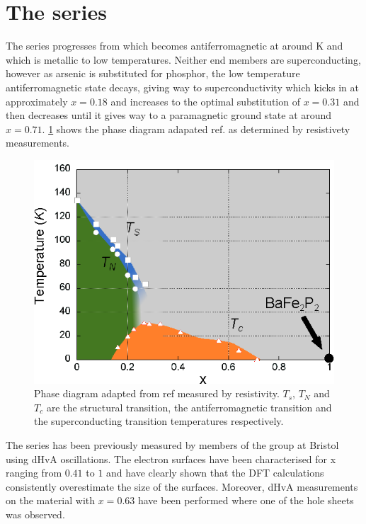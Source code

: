 
\section{The \BaFePAs series}

The \BaFeAsP series progresses from \BaFeAs which becomes antiferromagnetic at around \unit[138]{K} and \BaFeP which is metallic to low temperatures. Neither end members are superconducting, however as arsenic is substituted for phosphor, the low temperature antiferromagnetic state decays, giving way to superconductivity which kicks in at approximately $x=0.18$ and increases to the optimal substitution of $x=0.31$ and then decreases until it gives way to a paramagnetic ground state at around $x=0.71$. \Fig\ref{Fig:3:PhaseDiagram} shows the phase diagram adapated ref. \cite{Nakai2010a} as determined by resistivety measurements.

\begin{figure}
    \begin{center}
        \includegraphics[scale=0.7]{Chapter3-dHvABaFe2P2/Figures/BaFe2P2Series/PhaseDiagram/PhaseDiagram}
        \caption{Phase diagram adapted from ref \cite{Nakai2010a} measured by resistivity. $T_s$, $T_N$ and $T_c$ are the structural transition, the antiferromagnetic transition and the superconducting transition temperatures respectively.}
        \label{Fig:3:PhaseDiagram}
    \end{center}
\end{figure}


The \BaFePAs series has been previously measured by members of the group at Bristol using dHvA oscillations\cite{Shishido2010}. The electron surfaces have been characterised for x ranging from $0.41$ to $1$ and have clearly shown that the DFT calculations consistently overestimate the size of the surfaces. Moreover, dHvA measurements on the material with $x=0.63$ have been performed where one of the hole sheets was observed\cite{Analytis2010c}.
